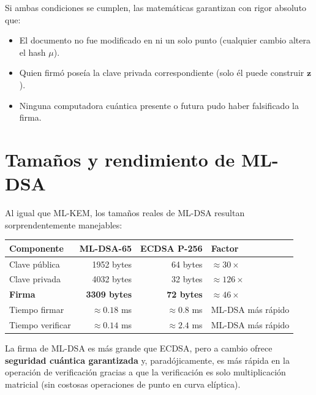 Si ambas condiciones se cumplen, las matemáticas garantizan con rigor absoluto que:
\begin{itemize}
  \item El documento no fue modificado en ni un solo punto (cualquier cambio altera el hash $\mu$).
  \item Quien firmó poseía la clave privada correspondiente (solo él puede construir $\mathbf{z}$).
  \item Ninguna computadora cuántica presente o futura pudo haber falsificado la firma.
\end{itemize}

\section{Tamaños y rendimiento de ML-DSA}

Al igual que ML-KEM, los tamaños reales de ML-DSA resultan sorprendentemente manejables:

\begin{center}
\begin{tabular}{lrrl}
\toprule
\textbf{Componente} & \textbf{ML-DSA-65} & \textbf{ECDSA P-256} & \textbf{Factor} \\
\midrule
Clave pública & 1952 bytes & 64 bytes & $\approx 30\times$ \\
Clave privada & 4032 bytes & 32 bytes & $\approx 126\times$ \\
\textbf{Firma} & \textbf{3309 bytes} & \textbf{72 bytes} & $\approx 46\times$ \\
Tiempo firmar & $\approx 0.18$ ms & $\approx 0.8$ ms & ML-DSA más rápido \\
Tiempo verificar & $\approx 0.14$ ms & $\approx 2.4$ ms & ML-DSA más rápido \\
\bottomrule
\end{tabular}
\end{center}

La firma de ML-DSA es más grande que ECDSA, pero a cambio ofrece \textbf{seguridad cuántica garantizada} y, paradójicamente, es más rápida en la operación de verificación gracias a que la verificación es solo multiplicación matricial (sin costosas operaciones de punto en curva elíptica).

